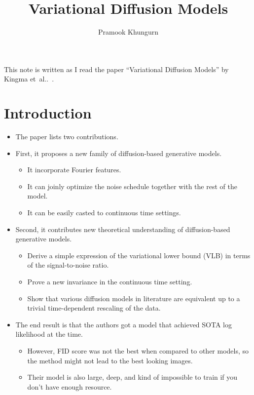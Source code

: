 \documentclass[10pt]{article}
\title{Variational Diffusion Models}
\author{Pramook Khungurn}
\newcommand{\etal}{{et~al.}}
\begin{document}
\maketitle

This note is written as I read the paper ``Variational Diffusion Models'' by Kingma \etal.~\cite{Kingma:2021}.

\section{Introduction}

\begin{itemize}
  \item The paper lists two contributions.
  
  \item First, it proposes a new family of diffusion-based generative models.
  \begin{itemize}
    \item It incorporate Fourier features.
    \item It can joinly optimize the noise schedule together with the rest of the model.
    \item It can be easily casted to continuous time settings.
  \end{itemize}

  \item Second, it contributes new theoretical understanding of diffusion-based generative models.
  \begin{itemize}
    \item Derive a simple expression of the variational lower bound (VLB) in terms of the signal-to-noise ratio.
    \item Prove a new invariance in the continuous time setting.
    \item Show that various diffusion models in literature are equivalent up to a trivial time-dependent rescaling of the data.
  \end{itemize}

  \item The end result is that the authors got a model that achieved SOTA log likelihood at the time.
  \begin{itemize}
    \item However, FID score was not the best when compared to other models, so the method might not lead to the best looking images.
    
    \item Their model is also large, deep, and kind of impossible to train if you don't have enough resource.
  \end{itemize}
\end{itemize}
\end{document}
